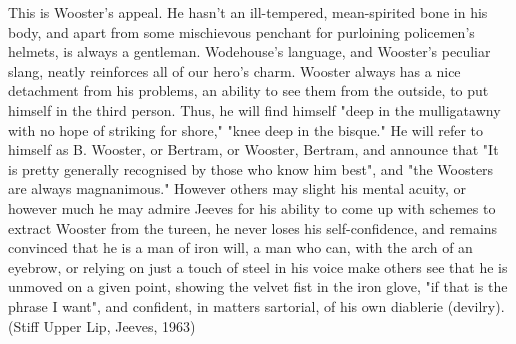 This is Wooster's appeal. He hasn't an ill-tempered, mean-spirited
bone in his body, and apart from some mischievous penchant for
purloining policemen's helmets, is always a gentleman. Wodehouse's
language, and Wooster's peculiar slang, neatly reinforces all of our
hero's charm. Wooster always has a nice detachment from his problems,
an ability to see them from the outside, to put himself in the third
person. Thus, he will find himself "deep in the mulligatawny with no
hope of striking for shore," "knee deep in the bisque." He will refer
to himself as B. Wooster, or Bertram, or Wooster, Bertram, and
announce that "It is pretty generally recognised by those who know him
best", and "the Woosters are always magnanimous." However others may
slight his mental acuity, or however much he may admire Jeeves for his
ability to come up with schemes to extract Wooster from the tureen, he
never loses his self-confidence, and remains convinced that he is a
man of iron will, a man who can, with the arch of an eyebrow, or
relying on just a touch of steel in his voice make others see that he
is unmoved on a given point, showing the velvet fist in the iron
glove, "if that is the phrase I want", and confident, in matters
sartorial, of his own diablerie (devilry). (Stiff Upper Lip, Jeeves,
1963)

